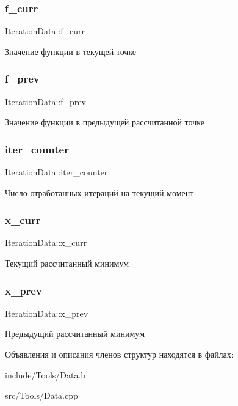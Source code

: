 \subsubsection{\texorpdfstring{f\+\_\+curr}{f\_curr}}
{\footnotesize\ttfamily Iteration\+Data\+::f\+\_\+curr}

Значение функции в текущей точке \mbox{\label{structIterationData_a7f0c8b8605e8ef5e0e11d753668f8db0}} 
\subsubsection{\texorpdfstring{f\+\_\+prev}{f\_prev}}
{\footnotesize\ttfamily Iteration\+Data\+::f\+\_\+prev}

Значение функции в предыдущей рассчитанной точке \mbox{\label{structIterationData_a7308a9e6f23ac24d49919a6355638f45}} 
\subsubsection{\texorpdfstring{iter\+\_\+counter}{iter\_counter}}
{\footnotesize\ttfamily Iteration\+Data\+::iter\+\_\+counter}

Число отработанных итераций на текущий момент \mbox{\label{structIterationData_a747b834728d763e1d963b4cf48070a82}} 
\subsubsection{\texorpdfstring{x\+\_\+curr}{x\_curr}}
{\footnotesize\ttfamily Iteration\+Data\+::x\+\_\+curr}

Текущий рассчитанный минимум \mbox{\label{structIterationData_a38b2cd3fa64b815db288dc609d04ce75}} 
\subsubsection{\texorpdfstring{x\+\_\+prev}{x\_prev}}
{\footnotesize\ttfamily Iteration\+Data\+::x\+\_\+prev}

Предыдущий рассчитанный минимум 

Объявления и описания членов структур находятся в файлах\+:\begin{DoxyCompactItemize}
\item 
include/\+Tools/Data.\+h\item 
src/\+Tools/Data.\+cpp\end{DoxyCompactItemize}
